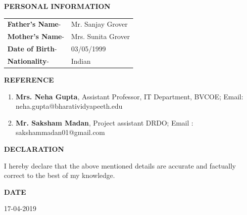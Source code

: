 \documentclass[10pt]{article}
\begin{document}
\vspace{5mm}
\begin{huge}
\textbf{\color{theme}PERSONAL INFORMATION}
\end{huge}
\begin{mdframed}[backgroundcolor=theme]
\end{mdframed}

\vspace{1mm}
\begin{flushleft}
\begin{tabular}{l l}\raggedleft

\color{black}\textbf{Father's Name}-& \color{black}Mr. Sanjay Grover \\ 
\textbf{Mother's Name}-& Mrs. Sunita Grover\\
\textbf{Date of Birth}-& 03/05/1999\\
\textbf{Nationality}-& Indian\\

\end{tabular}
\end{flushleft}

\vspace{2mm}

\vspace{5mm}
\begin{huge}
\textbf{\color{theme}REFERENCE}
\end{huge}
\begin{mdframed}[backgroundcolor=theme]
\end{mdframed}

\vspace{1mm}

\color{black}\normalsize{{
\begin{enumerate}
\item \textbf{Mrs. Neha Gupta}, Assistant Professor, IT Department, BVCOE; Email: neha.gupta@bharatividyapeeth.edu\\
\item \textbf{Mr. Saksham Madan}, Project assistant DRDO; Email : sakshammadan01@gmail.com\\



\end{enumerate}
}}

\vspace{5mm}
\begin{huge}
\textbf{\color{theme}DECLARATION}
\end{huge}
\begin{mdframed}[backgroundcolor=theme]
\end{mdframed}

I hereby declare that the above mentioned details are accurate and factually correct to the best of my knowledge.


\vspace{2mm}


\vspace{5mm}
\begin{huge}
\textbf{\color{theme}DATE}
\end{huge}
\begin{mdframed}[backgroundcolor=theme]
\end{mdframed}
17-04-2019
\end{document}

